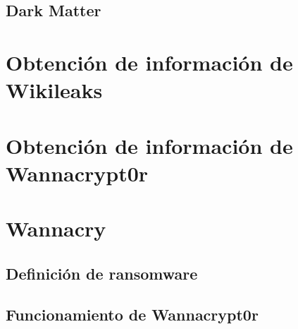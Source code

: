 \documentclass[a4paper,10pt]{article}
\begin{document}
\subsection{Dark Matter}





\section{Obtención de información de Wikileaks}





\section{Obtención de información de Wannacrypt0r}





\section{Wannacry}
\subsection{Definición de ransomware}

\subsection{Funcionamiento de Wannacrypt0r}
\label{Funcionamiento-Wannacry}

\end{document}
